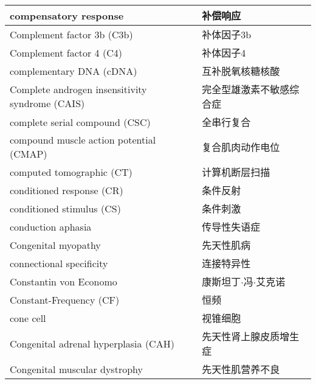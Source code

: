 \begin{longtable}{lll}
	\midrule
	compensatory response  && 补偿响应  \\
	
	\midrule
	Complement factor 3b (C3b)  && 补体因子3b  \\
	
	\midrule
	Complement factor 4 (C4)  && 补体因子4  \\
	
	\midrule
	complementary DNA (cDNA)   && 互补脱氧核糖核酸  \\
	
	\midrule
	\makecell[l]{Complete androgen insensitivity\\ syndrome (CAIS)}  && 完全型雄激素不敏感综合症  \\
	
	\midrule
	complete serial compound (CSC) && 全串行复合  \\
	
	\midrule
	compound muscle action potential (CMAP) && 复合肌肉动作电位  \\
	
	\midrule
	computed tomographic (CT)   && 计算机断层扫描  \\
	
	\midrule
	conditioned response (CR)    &&  条件反射  \\
	
	\midrule
	conditioned stimulus (CS)     &&  条件刺激  \\
	
	\midrule
	conduction aphasia    &&  传导性失语症  \\
	
	\midrule
	Congenital myopathy     &&  先天性肌病  \\
	
	\midrule
	connectional specificity     &&  连接特异性  \\
	
	\midrule
	Constantin von Economo    &&  康斯坦丁$\cdot$冯$\cdot$艾克诺  \\
	
	\midrule
	Constant-Frequency (CF)     &&  恒频  \\
	
	\midrule
	cone cell      && 视锥细胞  \\
	
	\midrule
	Congenital adrenal hyperplasia (CAH)  && 先天性肾上腺皮质增生症  \\
	
	\midrule
	Congenital muscular dystrophy  && 先天性肌营养不良  \\
	

\end{longtable}
